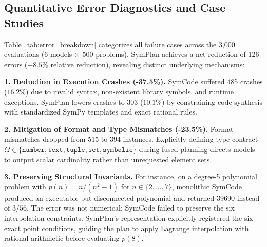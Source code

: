 \documentclass[conference,a4paper]{IEEEtran}
\begin{document}
\begin{table}[t]
\centering
\caption{Quantitative failure mode comparison between SymCode and SymPlan across all 3,000 problem evaluations on MATH-500.}
\label{tab:error_breakdown}
\end{table}

\subsection{Quantitative Error Diagnostics and Case Studies}
\label{sec:error_analysis}

Table~\ref{tab:error_breakdown} categorizes all failure cases across the 3,000 evaluations (6 models $\times$ 500 problems). SymPlan achieves a net reduction of 126 errors ($-8.5\%$ relative reduction), revealing distinct underlying mechanisms:

\textbf{1. Reduction in Execution Crashes (-37.5\%).} SymCode suffered 485 crashes ($16.2\%$) due to invalid syntax, non-existent library symbols, and runtime exceptions. SymPlan lowers crashes to 303 ($10.1\%$) by constraining code synthesis with standardized SymPy templates and exact rational rules.

\textbf{2. Mitigation of Format and Type Mismatches (-23.5\%).} Format mismatches dropped from 515 to 394 instances. Explicitly defining type contract $\Omega \in \{\texttt{number}, \texttt{text}, \texttt{tuple}, \texttt{set}, \texttt{symbolic}\}$ during fused planning directs models to output scalar cardinality rather than unrequested element sets.

\textbf{3. Preserving Structural Invariants.} For instance, on a degree-5 polynomial problem with $p(n) = n/(n^2 - 1)$ for $n \in \{2,\ldots,7\}$, monolithic SymCode produced an executable but disconnected polynomial and returned 39690 instead of $3/56$. The error was not numerical; SymCode failed to preserve the six interpolation constraints. SymPlan's representation explicitly registered the six exact point conditions, guiding the plan to apply Lagrange interpolation with rational arithmetic before evaluating $p(8)$.
\end{document}
